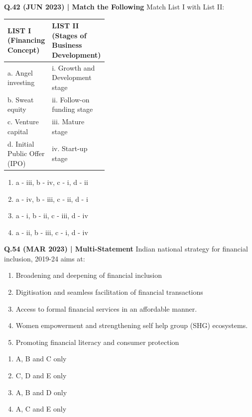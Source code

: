 \documentclass{article}
\begin{document}
\textbf{Q.42 (JUN 2023) | Match the Following}
Match List I with List II:
\begin{tabularx}{\linewidth}{@{} p{0.4\linewidth} X @{}}
    \toprule
    \textbf{LIST I (Financing Concept)} & \textbf{LIST II (Stages of Business Development)} \\
    \midrule
    a. Angel investing & i. Growth and Development stage \\
    b. Sweat equity & ii. Follow-on funding stage \\
    c. Venture capital & iii. Mature stage \\
    d. Initial Public Offer (IPO) & iv. Start-up stage \\
    \bottomrule
\end{tabularx}
\begin{enumerate}[label=(\arabic*)]
    \item a - iii, b - iv, c - i, d - ii
    \item a - iv, b - iii, c - ii, d - i
    \item a - i, b - ii, c - iii, d - iv
    \item a - ii, b - iii, c - i, d - iv
\end{enumerate}

\textbf{Q.54 (MAR 2023) | Multi-Statement}
Indian national strategy for financial inclusion, 2019-24 aims at:
\begin{enumerate}[label=\Alph*.]
    \item Broadening and deepening of financial inclusion
    \item Digitisation and seamless facilitation of financial transactions
    \item Access to formal financial services in an affordable manner.
    \item Women empowerment and strengthening self help group (SHG) ecosystems.
    \item Promoting financial literacy and consumer protection
\end{enumerate}
\begin{enumerate}[label=(\arabic*)]
    \item A, B and C only
    \item C, D and E only
    \item A, B and D only
    \item A, C and E only
\end{enumerate}
\end{document}
